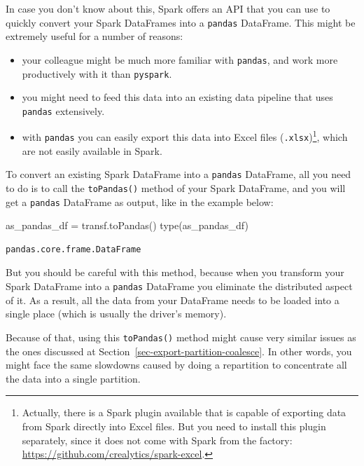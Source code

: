 \documentclass[
  11pt,
  letterpaper,
  DIV=11,
  numbers=noendperiod]{scrreprt}
\newenvironment{Shaded}{\begin{snugshade}}{\end{snugshade}}
\newcommand{\BuiltInTok}[1]{\textcolor[rgb]{0.00,0.23,0.31}{#1}}
\newcommand{\NormalTok}[1]{\textcolor[rgb]{0.00,0.23,0.31}{#1}}
\newcommand{\OperatorTok}[1]{\textcolor[rgb]{0.37,0.37,0.37}{#1}}
\providecommand{\tightlist}{%
  \setlength{\itemsep}{0pt}\setlength{\parskip}{0pt}}\usepackage{longtable,booktabs,array}
\begin{document}
In case you don't know about this, Spark offers an API that you can use
to quickly convert your Spark DataFrames into a \texttt{pandas}
DataFrame. This might be extremely useful for a number of reasons:

\begin{itemize}
\tightlist
\item
  your colleague might be much more familiar with \texttt{pandas}, and
  work more productively with it than \texttt{pyspark}.
\item
  you might need to feed this data into an existing data pipeline that
  uses \texttt{pandas} extensively.
\item
  with \texttt{pandas} you can easily export this data into Excel files
  (\texttt{.xlsx})\footnote{Actually, there is a Spark plugin available
    that is capable of exporting data from Spark directly into Excel
    files. But you need to install this plugin separately, since it does
    not come with Spark from the factory:
    \url{https://github.com/crealytics/spark-excel}.}, which are not
  easily available in Spark.
\end{itemize}

To convert an existing Spark DataFrame into a \texttt{pandas} DataFrame,
all you need to do is to call the \texttt{toPandas()} method of your
Spark DataFrame, and you will get a \texttt{pandas} DataFrame as output,
like in the example below:

\begin{Shaded}
\begin{Highlighting}[]
\NormalTok{as\_pandas\_df }\OperatorTok{=}\NormalTok{ transf.toPandas()}
\BuiltInTok{type}\NormalTok{(as\_pandas\_df)}
\end{Highlighting}
\end{Shaded}

\begin{verbatim}
pandas.core.frame.DataFrame
\end{verbatim}

But you should be careful with this method, because when you transform
your Spark DataFrame into a \texttt{pandas} DataFrame you eliminate the
distributed aspect of it. As a result, all the data from your DataFrame
needs to be loaded into a single place (which is usually the driver's
memory).

Because of that, using this \texttt{toPandas()} method might cause very
similar issues as the ones discussed at
Section~\ref{sec-export-partition-coalesce}. In other words, you might
face the same slowdowns caused by doing a repartition to concentrate all
the data into a single partition.
\end{document}
